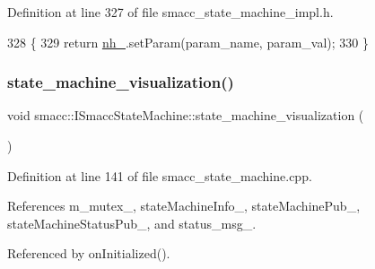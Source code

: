 Definition at line 327 of file smacc\+\_\+state\+\_\+machine\+\_\+impl.\+h.


\begin{DoxyCode}
328 \{
329     \textcolor{keywordflow}{return} \hyperlink{classsmacc_1_1ISmaccStateMachine_ad8877bcca9dbb345fe72cca839c93dd3}{nh\_}.setParam(param\_name, param\_val);
330 \}
\end{DoxyCode}
\mbox{\label{classsmacc_1_1ISmaccStateMachine_ac03029f770422d0ea77ea9856b8cb1a8}} 
\subsubsection{\texorpdfstring{state\+\_\+machine\+\_\+visualization()}{state\_machine\_visualization()}}
{\footnotesize\ttfamily void smacc\+::\+I\+Smacc\+State\+Machine\+::state\+\_\+machine\+\_\+visualization (\begin{DoxyParamCaption}\item[{const ros\+::\+Timer\+Event \&}]{ }\end{DoxyParamCaption})}



Definition at line 141 of file smacc\+\_\+state\+\_\+machine.\+cpp.



References m\+\_\+mutex\+\_\+, state\+Machine\+Info\+\_\+, state\+Machine\+Pub\+\_\+, state\+Machine\+Status\+Pub\+\_\+, and status\+\_\+msg\+\_\+.



Referenced by on\+Initialized().


